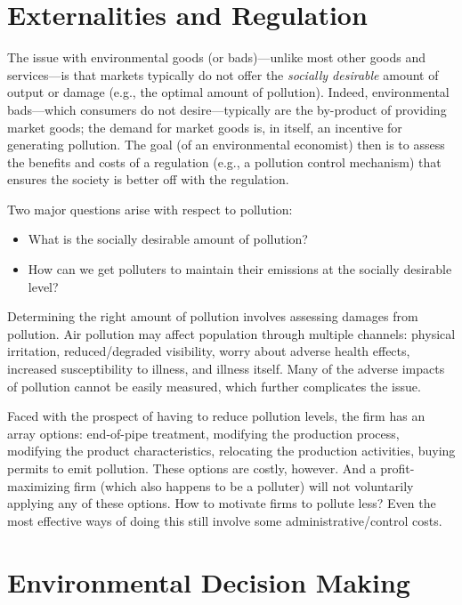 \documentclass[
]{book}
\providecommand{\tightlist}{%
  \setlength{\itemsep}{0pt}\setlength{\parskip}{0pt}}
\begin{document}
\hypertarget{externalities-and-regulation}{%
\section{Externalities and Regulation}\label{externalities-and-regulation}}

The issue with environmental goods (or bads)---unlike most other goods and services---is that markets typically do not offer the \emph{socially desirable} amount of output or damage (e.g., the optimal amount of pollution). Indeed, environmental bads---which consumers do not desire---typically are the by-product of providing market goods; the demand for market goods is, in itself, an incentive for generating pollution. The goal (of an environmental economist) then is to assess the benefits and costs of a regulation (e.g., a pollution control mechanism) that ensures the society is better off with the regulation.

Two major questions arise with respect to pollution:

\begin{itemize}
\tightlist
\item
  What is the socially desirable amount of pollution?
\item
  How can we get polluters to maintain their emissions at the socially desirable level?
\end{itemize}

Determining the right amount of pollution involves assessing damages from pollution. Air pollution may affect population through multiple channels: physical irritation, reduced/degraded visibility, worry about adverse health effects, increased susceptibility to illness, and illness itself. Many of the adverse impacts of pollution cannot be easily measured, which further complicates the issue.

Faced with the prospect of having to reduce pollution levels, the firm has an array options: end-of-pipe treatment, modifying the production process, modifying the product characteristics, relocating the production activities, buying permits to emit pollution. These options are costly, however. And a profit-maximizing firm (which also happens to be a polluter) will not voluntarily applying any of these options. How to motivate firms to pollute less? Even the most effective ways of doing this still involve some administrative/control costs.

\hypertarget{environmental-decision-making}{%
\section{Environmental Decision Making}\label{environmental-decision-making}}
\end{document}
